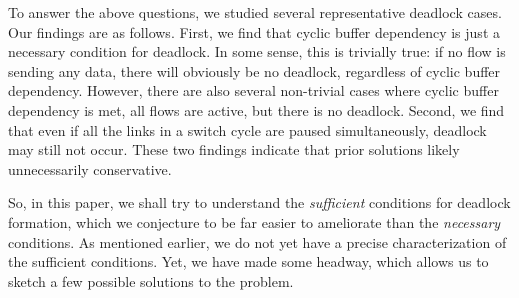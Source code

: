 To answer the above questions, we studied several representative deadlock cases.
Our findings are as follows. First, we find that cyclic buffer dependency is
just a necessary condition for deadlock. In some sense, this is trivially true:
if no flow is sending any data, there will obviously be no deadlock, regardless
of cyclic buffer dependency.  However, there are also several non-trivial cases
where cyclic buffer dependency is met, all flows are active, but there is
no deadlock.  Second, we find that even if all the links in a switch cycle are
paused simultaneously, deadlock may still not occur.  These two findings
indicate that prior solutions likely unnecessarily conservative. 

So, in this paper, we shall try to understand the {\em sufficient} conditions
for deadlock formation, which we conjecture to be far easier to ameliorate than
the {\em necessary} conditions. As mentioned earlier, we do not yet have a precise
characterization of the sufficient conditions. Yet, we have made some headway,
which allows us to sketch a few possible solutions to the problem.

